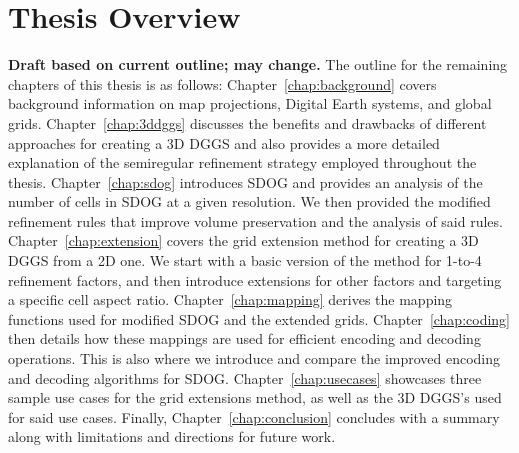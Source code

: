 \section{Thesis Overview}
\textbf{Draft based on current outline; may change.}
The outline for the remaining chapters of this thesis is as follows:
Chapter~\ref{chap:background} covers background information on map projections, Digital Earth systems, and global grids.
Chapter~\ref{chap:3ddggs} discusses the benefits and drawbacks of different approaches for creating a 3D DGGS and also provides a more detailed explanation of the semiregular refinement strategy employed throughout the thesis.
Chapter~\ref{chap:sdog} introduces SDOG and provides an analysis of the number of cells in SDOG at a given resolution.
We then provided the modified refinement rules that improve volume preservation and the analysis of said rules.
Chapter~\ref{chap:extension} covers the grid extension method for creating a 3D DGGS from a 2D one.
We start with a basic version of the method for 1-to-4 refinement factors, and then introduce extensions for other factors and targeting a specific cell aspect ratio.
Chapter~\ref{chap:mapping} derives the mapping functions used for modified SDOG and the extended grids.
Chapter~\ref{chap:coding} then details how these mappings are used for efficient encoding and decoding operations.
This is also where we introduce and compare the improved encoding and decoding algorithms for SDOG.
Chapter~\ref{chap:usecases} showcases three sample use cases for the grid extensions method, as well as the 3D DGGS's used for said use cases.
Finally, Chapter~\ref{chap:conclusion} concludes with a summary along with limitations and directions for future work.
